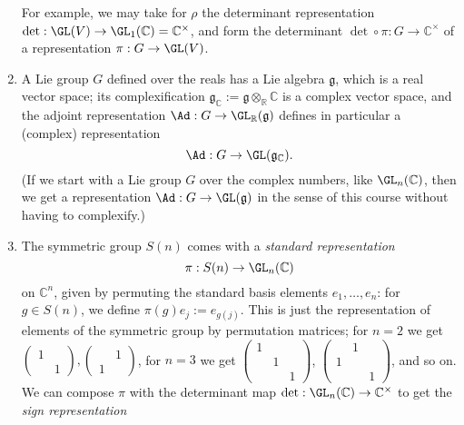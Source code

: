 \documentclass[reqno]{amsart} 
\begin{document}
\begin{example}
\begin{enumerate}
    For example, we may take for $\rho$ the determinant representation $\det : \GL(V) \rightarrow \GL_1(\mathbb{C}) = \mathbb{C}^\times$, and form the determinant $\det \circ \pi : G \rightarrow \mathbb{C}^\times$ of a representation $\pi : G \rightarrow \GL(V)$.
  \item A Lie group $G$ defined over the reals has a Lie algebra $\mathfrak{g}$, which is a real vector space; its complexification $\mathfrak{g}_{\mathbb{C}} := \mathfrak{g} \otimes_{\mathbb{R}} \mathbb{C}$ is a complex vector space, and the adjoint representation $\Ad : G \rightarrow \GL_{\mathbb{R}}(\mathfrak{g})$ defines in particular a (complex) representation
    \begin{equation*}
      \Ad : G \rightarrow \GL(\mathfrak{g}_{\mathbb{C}}).
    \end{equation*}
    (If we start with a Lie group $G$ over the complex numbers, like $\GL_n(\mathbb{C})$, then we get a representation $\Ad : G \rightarrow \GL(\mathfrak{g})$ in the sense of this course without having to complexify.)
  \item The symmetric group $S(n)$ comes with a \emph{standard representation}
    \begin{equation*}
      \pi : S(n) \rightarrow \GL_n(\mathbb{C})
    \end{equation*}
    on $\mathbb{C}^n$, given by permuting the standard basis elements $e_1,\dotsc,e_n$: for $g \in S(n)$, we define $\pi(g) e_j := e_{g(j)}$.  This is just the representation of elements of the symmetric group by permutation matrices; for $n=2$ we get $
\begin{pmatrix}
      1 &  \\
        & 1
    \end{pmatrix}
, 
\begin{pmatrix}
      & 1 \\
      1 &
    \end{pmatrix}
$, for $n = 3$ we get $
\begin{pmatrix}
      1 &  &  \\
        & 1 &  \\
        & & 1
    \end{pmatrix}
$, $
\begin{pmatrix}
      & 1 &  \\
      1 &  &  \\
      & & 1
    \end{pmatrix}
$, and so on.  We can compose $\pi$ with the determinant map $\det : \GL_n(\mathbb{C}) \rightarrow \mathbb{C}^\times$ to get the \emph{sign representation}

\end{enumerate}
\end{example}
\end{document}
